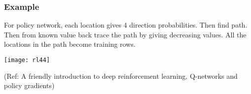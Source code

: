 \begin{frame}[fragile]\frametitle{Example}

For policy network, each location gives 4 direction probabilities. Then find path. Then from known value back trace the path by giving decreasing values. All the locations in the path become training rows.

\begin{center}
\texttt{[image: rl44]}
\end{center}


{\tiny (Ref: A friendly introduction to deep reinforcement learning, Q-networks and policy gradients)}

\end{frame}